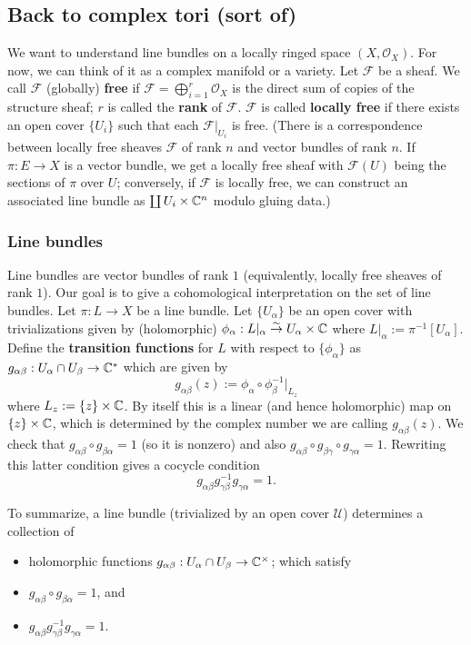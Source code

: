 \subsection{Back to complex tori (sort of)}
We want to understand line bundles on a locally ringed space $(X,\mathcal{O}_X)$. For now, we can think of it as a complex manifold or a variety. Let $\mathcal{F}$ be a sheaf. We call $\mathcal{F}$ (globally) \textbf{free} if $\mathcal{F}=\bigoplus_{i=1}^r \mathcal{O}_X$ is the direct sum of copies of the structure sheaf; $r$ is called the \textbf{rank} of $\mathcal{F}$. $\mathcal{F}$ is called \textbf{locally free} if there exists an open cover $\{U_i\}$ such that each $\mathcal{F}|_{U_i}$ is free. (There is a correspondence between locally free sheaves $\mathcal{F}$ of rank $n$ and vector bundles of rank $n$. If $\pi:E\to X$ is a vector bundle, we get a locally free sheaf with $\mathcal{F}(U)$ being the sections of $\pi$ over $U$; conversely, if $\mathcal{F}$ is locally free, we can construct an associated line bundle as $\coprod U_i\times {\mathbb C}^n$ modulo gluing data.) 

\subsubsection{Line bundles}

Line bundles are vector bundles of rank $1$ (equivalently, locally free sheaves of rank $1$). Our goal is to give a cohomological interpretation on the set of line bundles. Let $\pi:L\to X$ be a line bundle. Let $\{U_\alpha\}$ be an open cover with trivializations given by (holomorphic) $\phi_\alpha: L|_\alpha\overset{\sim}{\rightarrow} U_\alpha\times {\mathbb C}$ where $L|_\alpha:=\pi^{-1}[U_\alpha]$. Define the \textbf{transition functions} for $L$ with respect to $\{\phi_\alpha\}$ as $g_{\alpha\beta}:U_\alpha\cap U_\beta \to {\mathbb C}^*$ which are given by 
$$g_{\alpha\beta}(z):=\phi_\alpha\circ \phi_\beta^{-1}|_{L_z}$$
where $L_z:=\{z\}\times {\mathbb C}$. By itself this is a linear (and hence holomorphic) map on $\{z\}\times {\mathbb C}$, which is determined by the complex number we are calling $g_{\alpha\beta}(z)$. We check that 
$g_{\alpha\beta}\circ g_{\beta\alpha}=1$ (so it is nonzero) and also $g_{\alpha\beta}\circ g_{\beta\gamma}\circ g_{\gamma\alpha}=1$. Rewriting this latter condition gives a cocycle condition
$$g_{\alpha\beta}g_{\gamma\beta}^{-1}g_{\gamma\alpha}=1.$$

To summarize, a line bundle (trivialized by an open cover $\mathcal{U}$) determines a collection of 
\begin{itemize}
\item holomorphic functions $g_{\alpha\beta}:U_\alpha\cap U_\beta\to {\mathbb C}^\times$; which satisfy 
\item $g_{\alpha\beta}\circ g_{\beta\alpha}=1$, and
\item $g_{\alpha\beta}g_{\gamma\beta}^{-1}g_{\gamma\alpha}=1$.
\end{itemize}

